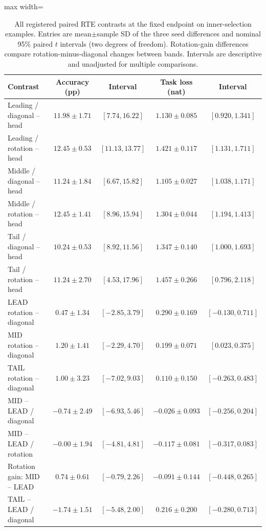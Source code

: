 \documentclass{article}
\begin{document}
\begin{table}[t]
\centering
\caption{All registered paired RTE contrasts at the fixed endpoint on inner-selection examples. Entries are mean$\pm$sample SD of the three seed differences and nominal 95\% paired $t$ intervals (two degrees of freedom). Rotation-gain differences compare rotation-minus-diagonal changes between bands. Intervals are descriptive and unadjusted for multiple comparisons.}
\label{tab:bandpaired}
\begin{adjustbox}{max width=\linewidth}
\begin{tabular}{lcccc}
\toprule
Contrast & Accuracy (pp) & Interval & Task loss (nat) & Interval\\
\midrule
Leading / diagonal -- head & $11.98 \pm 1.71$ & $[7.74,16.22]$ & $1.130 \pm 0.085$ & $[0.920,1.341]$ \\
Leading / rotation -- head & $12.45 \pm 0.53$ & $[11.13,13.77]$ & $1.421 \pm 0.117$ & $[1.131,1.711]$ \\
Middle / diagonal -- head & $11.24 \pm 1.84$ & $[6.67,15.82]$ & $1.105 \pm 0.027$ & $[1.038,1.171]$ \\
Middle / rotation -- head & $12.45 \pm 1.41$ & $[8.96,15.94]$ & $1.304 \pm 0.044$ & $[1.194,1.413]$ \\
Tail / diagonal -- head & $10.24 \pm 0.53$ & $[8.92,11.56]$ & $1.347 \pm 0.140$ & $[1.000,1.693]$ \\
Tail / rotation -- head & $11.24 \pm 2.70$ & $[4.53,17.96]$ & $1.457 \pm 0.266$ & $[0.796,2.118]$ \\
LEAD rotation -- diagonal & $0.47 \pm 1.34$ & $[-2.85,3.79]$ & $0.290 \pm 0.169$ & $[-0.130,0.711]$ \\
MID rotation -- diagonal & $1.20 \pm 1.41$ & $[-2.29,4.70]$ & $0.199 \pm 0.071$ & $[0.023,0.375]$ \\
TAIL rotation -- diagonal & $1.00 \pm 3.23$ & $[-7.02,9.03]$ & $0.110 \pm 0.150$ & $[-0.263,0.483]$ \\
MID -- LEAD / diagonal & $-0.74 \pm 2.49$ & $[-6.93,5.46]$ & $-0.026 \pm 0.093$ & $[-0.256,0.204]$ \\
MID -- LEAD / rotation & $-0.00 \pm 1.94$ & $[-4.81,4.81]$ & $-0.117 \pm 0.081$ & $[-0.317,0.083]$ \\
Rotation gain: MID -- LEAD & $0.74 \pm 0.61$ & $[-0.79,2.26]$ & $-0.091 \pm 0.144$ & $[-0.448,0.265]$ \\
TAIL -- LEAD / diagonal & $-1.74 \pm 1.51$ & $[-5.48,2.00]$ & $0.216 \pm 0.200$ & $[-0.280,0.713]$ \\

\end{tabular}
\end{adjustbox}
\end{table}
\end{document}
